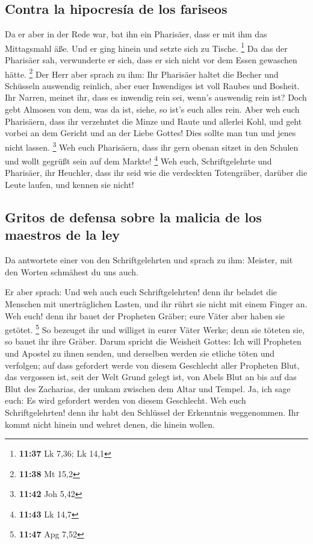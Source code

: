 \hypertarget{contra-la-hipocresuxeda-de-los-fariseos}{%
\subsection{Contra la hipocresía de los
fariseos}\label{contra-la-hipocresuxeda-de-los-fariseos}}

 Da er aber in der Rede war, bat ihn ein Pharisäer, dass
er mit ihm das Mittagsmahl äße. Und er ging hinein und setzte sich zu
Tische. \footnote{\textbf{11:37} Lk 7,36; Lk 14,1}  Da
das der Pharisäer sah, verwunderte er sich, dass er sich nicht vor dem
Essen gewaschen hätte. \footnote{\textbf{11:38} Mt 15,2} 
Der Herr aber sprach zu ihm: Ihr Pharisäer haltet die Becher und
Schüsseln auswendig reinlich, aber euer Inwendiges ist voll Raubes und
Bosheit.  Ihr Narren, meinet ihr, dass es inwendig rein
sei, wenn's auswendig rein ist?  Doch gebt Almosen von
dem, was da ist, siehe, so ist's euch alles rein.  Aber
weh euch Pharisäern, dass ihr verzehntet die Minze und Raute und
allerlei Kohl, und geht vorbei an dem Gericht und an der Liebe Gottes!
Dies sollte man tun und jenes nicht lassen. \footnote{\textbf{11:42} Joh
  5,42}  Weh euch Pharisäern, dass ihr gern obenan sitzet
in den Schulen und wollt gegrüßt sein auf dem Markte! \footnote{\textbf{11:43}
  Lk 14,7}  Weh euch, Schriftgelehrte und Pharisäer, ihr
Heuchler, dass ihr seid wie die verdeckten Totengräber, darüber die
Leute laufen, und kennen sie nicht!

\hypertarget{gritos-de-defensa-sobre-la-malicia-de-los-maestros-de-la-ley}{%
\subsection{Gritos de defensa sobre la malicia de los maestros de la
ley}\label{gritos-de-defensa-sobre-la-malicia-de-los-maestros-de-la-ley}}

 Da antwortete einer von den Schriftgelehrten und sprach
zu ihm: Meister, mit den Worten schmähest du uns auch.

 Er aber sprach: Und weh auch euch Schriftgelehrten! denn
ihr beladet die Menschen mit unerträglichen Lasten, und ihr rührt sie
nicht mit einem Finger an.  Weh euch! denn ihr bauet der
Propheten Gräber; eure Väter aber haben sie getötet. \footnote{\textbf{11:47}
  Apg 7,52}  So bezeuget ihr und williget in eurer Väter
Werke; denn sie töteten sie, so bauet ihr ihre Gräber. 
Darum spricht die Weisheit Gottes: Ich will Propheten und Apostel zu
ihnen senden, und derselben werden sie etliche töten und verfolgen;
 auf dass gefordert werde von diesem Geschlecht aller
Propheten Blut, das vergossen ist, seit der Welt Grund gelegt ist,
 von Abels Blut an bis auf das Blut des Zacharias, der
umkam zwischen dem Altar und Tempel. Ja, ich sage euch: Es wird
gefordert werden von diesem Geschlecht.  Weh euch
Schriftgelehrten! denn ihr habt den Schlüssel der Erkenntnis
weggenommen. Ihr kommt nicht hinein und wehret denen, die hinein wollen.

